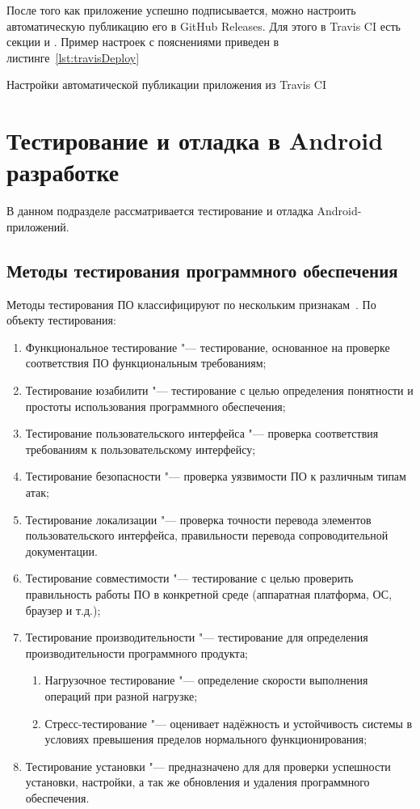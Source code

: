 После того как приложение успешно подписывается, можно настроить автоматическую публикацию его в GitHub Releases.
Для этого в Travis CI есть секции  и .
Пример настроек с пояснениями приведен в листинге~\ref{lst:travisDeploy}

\begin{listing}[h]
  \caption{Настройки автоматической публикации приложения из Travis CI}
  \label{lst:travisDeploy}
\end{listing}

\section{Тестирование и отладка в Android разработке}
\label{sec:testing}

В данном подразделе рассматривается тестирование и отладка Android-приложений.

\subsection{Методы тестирования программного обеспечения}
\label{subsec:testing:methods}

Методы тестирования ПО классифицируют по нескольким признакам~\cite{wiki:testing}.
По объекту тестирования:
\begin{enumerate}
  \item Функциональное тестирование "--- тестирование, основанное на проверке соответствия ПО функциональным требованиям;
  \item Тестирование юзабилити "--- тестирование с целью определения понятности и простоты использования программного обеспечения;
  \item Тестирование пользовательского интерфейса "--- проверка соответствия требованиям к пользовательскому интерфейсу;
  \item Тестирование безопасности "--- проверка уязвимости ПО к различным типам атак;
  \item Тестирование локализации "--- проверка точности перевода элементов пользовательского интерфейса, правильности перевода сопроводительной документации.
  \item Тестирование совместимости "--- тестирование с целью проверить правильность работы ПО в конкретной среде (аппаратная платформа, ОС, браузер и т.д.);
  \item Тестирование производительности "--- тестирование для определения производительности программного продукта;
  \begin{enumerate}
    \item Нагрузочное тестирование "--- определение скорости выполнения операций при разной нагрузке;
    \item Стресс-тестирование "--- оценивает надёжность и устойчивость системы в условиях превышения пределов нормального функционирования;
  \end{enumerate}
  \item Тестирование установки "--- предназначено для для проверки успешности установки, настройки, а так же обновления и удаления программного обеспечения.
\end{enumerate}

